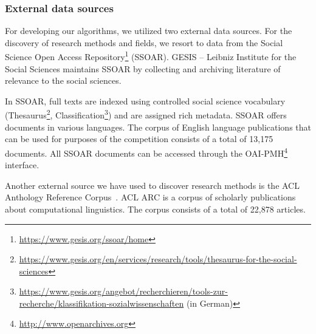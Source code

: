 \subsubsection{External data sources}
\label{sec:external_data_sources}
For developing our algorithms, we utilized two external data sources.
For the discovery of research methods and fields, we resort to data from the Social Science Open Access Repository\footnote{\url{https://www.gesis.org/ssoar/home}} (SSOAR). 
GESIS – Leibniz Institute for the Social Sciences maintains  SSOAR by collecting and archiving literature of relevance to the social sciences. 

In SSOAR, full texts are indexed using controlled social science vocabulary (Thesaurus\footnote{\url{https://www.gesis.org/en/services/research/tools/thesaurus-for-the-social-sciences}}, Classification\footnote{\url{https://www.gesis.org/angebot/recherchieren/tools-zur-recherche/klassifikation-sozialwissenschaften} (in German)}) and are assigned rich metadata. SSOAR offers documents in various languages. The corpus of English language publications that can be used for purposes of the competition consists of a total of 13,175 documents. All SSOAR documents can be accessed through the OAI-PMH\footnote{{\url{http://www.openarchives.org}}} interface. 

Another external source we have used to discover research methods is the ACL Anthology Reference Corpus~\cite{bird2008acl}. ACL ARC is a corpus of scholarly publications about computational linguistics.  
The corpus consists of a total of 22,878 articles.


